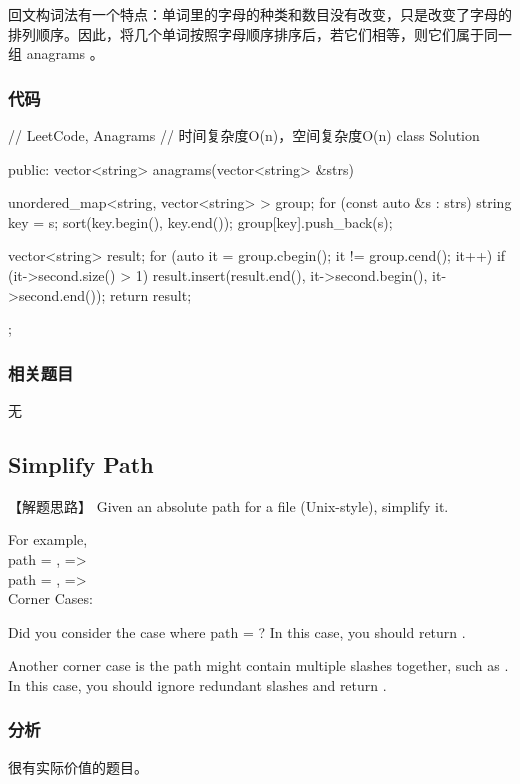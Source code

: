 回文构词法有一个特点：单词里的字母的种类和数目没有改变，只是改变了字母的排列顺序。因此，将几个单词按照字母顺序排序后，若它们相等，则它们属于同一组 anagrams 。


\subsubsection{代码}
\begin{Code}
	// LeetCode, Anagrams
	// 时间复杂度O(n)，空间复杂度O(n)
	class Solution {
		public:
		vector<string> anagrams(vector<string> &strs) {
			unordered_map<string, vector<string> > group;
			for (const auto &s : strs) {
				string key = s;
				sort(key.begin(), key.end());
				group[key].push_back(s);
			}
			
			vector<string> result;
			for (auto it = group.cbegin(); it != group.cend(); it++) {
				if (it->second.size() > 1)
				result.insert(result.end(), it->second.begin(), it->second.end());
			}
			return result;
		}
	};
\end{Code}


\subsubsection{相关题目}
\begindot
\item 无
\myenddot


\subsection{Simplify Path} %
\label{sec:simplify-path}


【解题思路】
Given an absolute path for a file (Unix-style), simplify it.

For example, \\
path = , =>  \\
path = , =>  \\

Corner Cases:
\begindot
\item Did you consider the case where path = ? 
In this case, you should return .
\item 
Another corner case is the path might contain multiple slashes  together, such as .
In this case, you should ignore redundant slashes and return .
\myenddot


\subsubsection{分析}
很有实际价值的题目。



